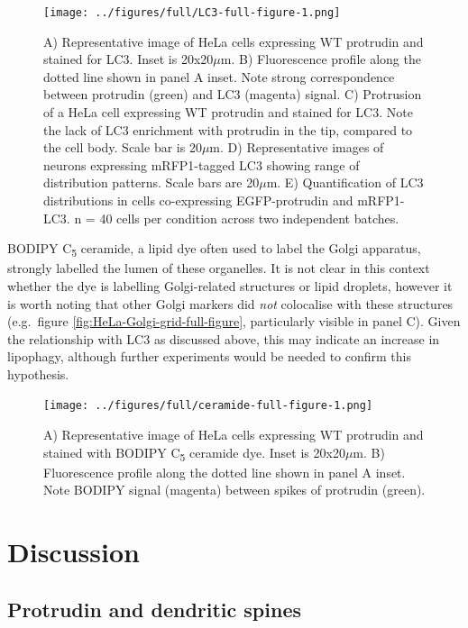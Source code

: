 \documentclass[
  12pt,
  a4paper,
]{book}
\begin{document}
\begin{figure}
\centering
\texttt{[image: ../figures/full/LC3-full-figure-1.png]}
\caption{\label{fig:LC3-full-figure}A) Representative image of HeLa cells expressing WT protrudin and stained for LC3. Inset is 20x20\(\mu\)m. B) Fluorescence profile along the dotted line shown in panel A inset. Note strong correspondence between protrudin (green) and LC3 (magenta) signal. C) Protrusion of a HeLa cell expressing WT protrudin and stained for LC3. Note the lack of LC3 enrichment with protrudin in the tip, compared to the cell body. Scale bar is 20\(\mu\)m. D) Representative images of neurons expressing mRFP1-tagged LC3 showing range of distribution patterns. Scale bars are 20\(\mu\)m. E) Quantification of LC3 distributions in cells co-expressing EGFP-protrudin and mRFP1-LC3. n = 40 cells per condition across two independent batches.}
\end{figure}

BODIPY C\textsubscript{5} ceramide, a lipid dye often used to label the Golgi apparatus, strongly labelled the lumen of these organelles. It is not clear in this context whether the dye is labelling Golgi-related structures or lipid droplets, however it is worth noting that other Golgi markers did \emph{not} colocalise with these structures (e.g.~figure \ref{fig:HeLa-Golgi-grid-full-figure}, particularly visible in panel C). Given the relationship with LC3 as discussed above, this may indicate an increase in lipophagy, although further experiments would be needed to confirm this hypothesis.

\begin{figure}
\centering
\texttt{[image: ../figures/full/ceramide-full-figure-1.png]}
\caption{\label{fig:ceramide-full-figure}A) Representative image of HeLa cells expressing WT protrudin and stained with BODIPY C\textsubscript{5} ceramide dye. Inset is 20x20\(\mu\)m. B) Fluorescence profile along the dotted line shown in panel A inset. Note BODIPY signal (magenta) between spikes of protrudin (green).}
\end{figure}

\hypertarget{discussion}{%
\section{Discussion}\label{discussion}}

\hypertarget{protrudin-and-dendritic-spines}{%
\subsection{Protrudin and dendritic spines}\label{protrudin-and-dendritic-spines}}
\end{document}
